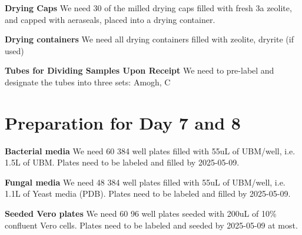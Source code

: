 \documentclass{article}
\begin{document}
\textbf{Drying Caps} We need 30 of the milled drying caps filled with fresh 3a zeolite, and capped with aeraseals, placed into a drying container. 

\textbf{Drying containers} We need all drying containers filled with zeolite, dryrite (if used) 

\textbf{Tubes for Dividing Samples Upon Receipt} We need to pre-label and designate the tubes into three sets: Amogh, C

\section{Preparation for Day 7 and 8}\label{sec:day7-prep}
\textbf{Bacterial media} We need 60 384 well plates filled with 55uL of UBM/well, i.e. 1.5L of UBM. Plates need to be labeled and filled by 2025-05-09.

\textbf{Fungal media} We need 48 384 well plates filled with 55uL of UBM/well, i.e. 1.1L of Yeast media (PDB). Plates need to be labeled and filled by 2025-05-09.

\textbf{Seeded Vero plates} We need 60 96 well plates seeded with 200uL of 10\% confluent Vero cells. Plates need to be labeled and seeded by 2025-05-09 at most. 
\end{document}
